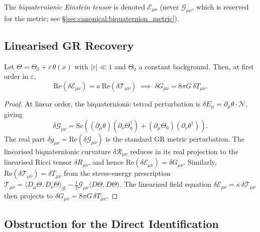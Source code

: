 The \emph{biquaternionic Einstein tensor} is denoted $\mathcal{E}_{\mu\nu}$
(never $\mathcal{G}_{\mu\nu}$, which is reserved for the metric; see
\S\ref{sec:canonical:biquaternion_metric}).

\subsection{Linearised GR Recovery}

\begin{theorem}
  \label{thm:linearised_gr}
  Let $\Theta = \Theta_0 + \varepsilon\,\theta(x)$ with $|\varepsilon|\ll 1$
  and $\Theta_0$ a constant background.  Then, at first order in $\varepsilon$,
  \begin{equation}
    \mathrm{Re}\!\left(\delta\mathcal{E}_{\mu\nu}\right)
    = \kappa\,\mathrm{Re}\!\left(\delta\mathcal{T}_{\mu\nu}\right)
    \;\implies\;
    \delta G_{\mu\nu} = 8\pi G\,\delta T_{\mu\nu}.
  \end{equation}
\end{theorem}

\begin{proof}
  At linear order, the biquaternionic tetrad perturbation is
  $\delta E_\mu = \partial_\mu\theta\cdot\mathcal{N}$, giving
  \begin{equation}
    \delta\mathcal{G}_{\mu\nu}
    = \mathrm{Sc}\!\left((\partial_\mu\theta)(\partial_\nu\Theta_0^\dagger)
      + (\partial_\mu\Theta_0)(\partial_\nu\theta^\dagger)\right).
  \end{equation}
  The real part $\delta g_{\mu\nu} = \mathrm{Re}(\delta\mathcal{G}_{\mu\nu})$
  is the standard GR metric perturbation.  The linearised biquaternionic
  curvature $\delta\mathcal{R}_{\mu\nu}$ reduces in its real projection to the
  linearised Ricci tensor $\delta R_{\mu\nu}$, and hence
  $\mathrm{Re}(\delta\mathcal{E}_{\mu\nu}) = \delta G_{\mu\nu}$.
  Similarly, $\mathrm{Re}(\delta\mathcal{T}_{\mu\nu}) = \delta T_{\mu\nu}$
  from the stress-energy prescription
  $\mathcal{T}_{\mu\nu} = \langle D_\mu\Theta, D_\nu\Theta\rangle_\mathcal{B}
  - \tfrac{1}{2}\mathcal{G}_{\mu\nu}\langle D\Theta,D\Theta\rangle$.
  The linearised field equation $\delta\mathcal{E}_{\mu\nu}=\kappa\,\delta\mathcal{T}_{\mu\nu}$
  then projects to $\delta G_{\mu\nu} = 8\pi G\,\delta T_{\mu\nu}$.
\end{proof}

\subsection{Obstruction for the Direct Identification}
\label{subsec:obstruction}

